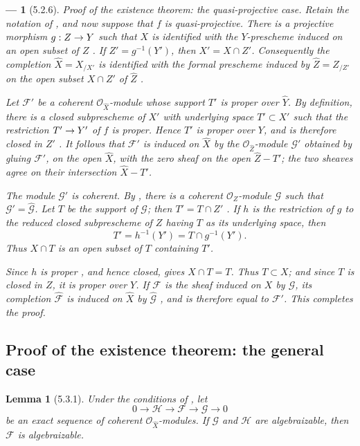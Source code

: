 \documentclass[oneside]{amsart}
\theoremstyle{ega-env-style}
\newtheorem*{env}{---}
\theoremstyle{ega-thm-env-style}
\newtheorem*{lemma}{Lemma}
\theoremstyle{ega-defn-env-style}
\def\mathcal{\mathscr}
\def\sh{\mathcal}                   %
\renewcommand{\to}{\mathchoice{\longrightarrow}{\rightarrow}{\rightarrow}{\rightarrow}}
\newcommand{\oldpage}[2][]{{\marginnote{\normalfont{\textbf{#1}~|~#2}}}\ignorespaces}
\let\EGAOriginalLabel\label
\renewcommand{\label}[1]{\phantomsection\EGAOriginalLabel{#1}}
\begin{document}
\begin{env}[5.2.6]
\label{III.5.2.6}
\emph{Proof of the existence theorem: the quasi-projective case.}
Retain the notation of , and now suppose that $f$
is quasi-projective.  There is a projective morphism
$g:Z\to Y$ such that $X$ is identified with the $Y$-prescheme
induced on an open subset of $Z$ .  If
$Z'=g^{-1}(Y')$, then $X'=X\cap Z'$.  Consequently the completion
$\widehat{X}=X_{/X'}$ is identified with the formal prescheme
induced by $\widehat{Z}=Z_{/Z'}$ on the open subset $X\cap Z'$ of
$\widehat{Z}$ .

Let $\sh{F}'$ be a coherent $\sh{O}_{\widehat{X}}$-module whose
support $T'$ is proper over $\widehat{Y}$.  By definition, there
is a closed subprescheme of $X'$ with underlying space
$T'\subset X'$ such that the restriction $T'\to Y'$ of $f$ is
proper.  Hence $T'$ is proper over $Y$, and is therefore closed in
$Z'$ .  It follows that $\sh{F}'$ is induced
on $\widehat{X}$ by the $\sh{O}_{\widehat{Z}}$-module $\sh{G}'$
obtained by gluing $\sh{F}'$, on the open $\widehat{X}$, with the
zero sheaf on the open $\widehat{Z}-T'$; the two sheaves agree on
their intersection $\widehat{X}-T'$.

The module $\sh{G}'$ is coherent.  By , there is a
coherent $\sh{O}_Z$-module $\sh{G}$ such that
$\sh{G}'=\widehat{\sh{G}}$.  Let $T$ be the support of $\sh{G}$;
then $T'=T\cap Z'$ .  If $h$ is the restriction
of $g$ to the reduced closed subprescheme of $Z$ having $T$ as
its underlying space, then
\[
  T'=h^{-1}(Y')=T\cap g^{-1}(Y').
\]
Thus $X\cap T$ is an open subset of $T$ containing $T'$.

\oldpage[III]{154}
Since $h$ is proper , and hence closed,
 gives $X\cap T=T$.  Thus $T\subset X$; and
since $T$ is closed in $Z$, it is proper over $Y$.  If $\sh{F}$ is
the sheaf induced on $X$ by $\sh{G}$, its completion
$\widehat{\sh{F}}$ is induced on $\widehat{X}$ by
$\widehat{\sh{G}}$ , and is therefore equal to
$\sh{F}'$.  This completes the proof.
\end{env}


\subsection{Proof of the existence theorem: the general case}
\label{subsection:III.5.3}

\begin{lemma}[5.3.1]
\label{III.5.3.1}
Under the conditions of , let
\[
  0\longrightarrow\sh{H}\longrightarrow\sh{F}
  \longrightarrow\sh{G}\longrightarrow0
\]
be an exact sequence of coherent
$\sh{O}_{\widehat{X}}$-modules.  If $\sh{G}$ and $\sh{H}$ are
algebraizable, then $\sh{F}$ is algebraizable.
\end{lemma}
\end{document}
